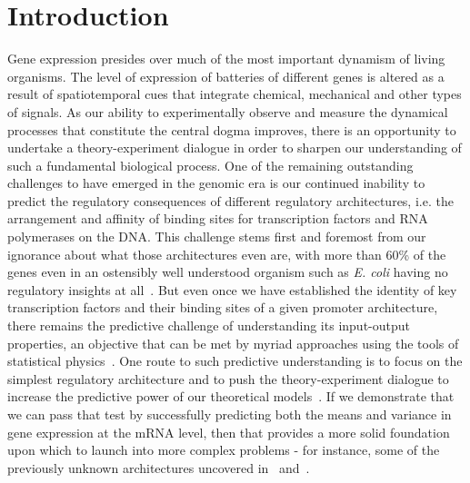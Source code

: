 \section{Introduction}

Gene expression presides over much of the most important dynamism of living
organisms. The level of expression of batteries of different genes is altered as
a result of spatiotemporal cues that integrate chemical, mechanical and other
types of signals. As our ability to experimentally observe and measure the
dynamical processes that constitute the central dogma improves, there is an
opportunity to undertake a theory-experiment dialogue in order to sharpen our
understanding of such a fundamental biological process. One of the remaining
outstanding challenges to have emerged in the genomic era is our continued
inability to predict the regulatory consequences of different regulatory
architectures, i.e. the arrangement and affinity of binding sites for
transcription factors and RNA polymerases on the DNA. This challenge stems first
and foremost from our ignorance about what those architectures even are, with
more than 60\% of the genes even in an ostensibly well understood organism such
as {\it E. coli} having no regulatory insights at all~\cite{Rydenfelt2014-2,
Belliveau2018, Ghatak2019, Santos_Zavaleta2019}. But even once we have
established the identity of key transcription factors and their binding sites of
a given promoter architecture, there remains the predictive challenge of
understanding its input-output properties, an objective that can be met by
myriad approaches using the tools of statistical physics~\cite{Ackers1982,
Shea1985, Buchler2003, Vilar2003a, Vilar2003b, Bintu2005a, Bintu2005c,
Kuhlman2007, Gertz2009, Sherman2012, Saiz2013, Ko1991, Peccoud1995, Record1996,
Kepler2001, Sanchez2008, Shahrezaei2008, Sanchez2011, Michel2010,
Iyer-Biswas2009}. One route to such predictive understanding is to focus on the
simplest regulatory architecture and to push the theory-experiment dialogue to
increase the predictive power of our theoretical models~\cite{Garcia2011,
Phillips2019}. If we demonstrate that we can pass that test by successfully
predicting both the means and variance in gene expression at the mRNA level,
then that provides a more solid foundation upon which to launch into more
complex problems - for instance, some of the previously unknown architectures
uncovered in~\cite{Belliveau2018} and~\cite{Ireland2020}.

